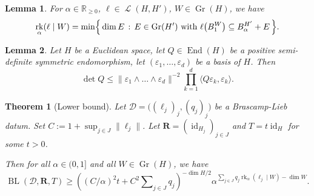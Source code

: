 \documentclass[10pt,a4paper]{amsart}
\newtheorem{thm}{Theorem}
\newtheorem{lemma}{Lemma}
\DeclareMathOperator{\BL}{BL}
\DeclareMathOperator{\Ell}{\mathscr{L}}
\DeclareMathOperator{\End}{End}
\DeclareMathOperator{\Gr}{Gr}
\newcommand{\R}{\mathbb{R}}
\DeclareMathOperator{\Span}{Span}
\newcommand{\bR}{\mathbf{R}}
\newcommand{\eps}{\varepsilon}
\DeclareMathOperator{\id}{id}
\DeclareMathOperator{\rk}{rk}
\newcommand{\sD} {{\mathscr D}}
\newcommand{\setBig}[1]{\Bigl\{\, #1 \,\Bigr\}}
\begin{document}
\begin{lemma}
\label{lm:arank}
For $\alpha \in \R_{\geq 0}$, $\ell \in \Ell(H,H')$,  $W \in \Gr(H)$, we have
\[
\rk_{\alpha}(\ell \mid W) = \min \setBig{\dim E \,:\, E \in \Gr(H') \text{ with } \ell \bigl(B^W_1\bigr) \subseteq B^{H'}_\alpha + E}.
\]
\end{lemma}

\begin{lemma}\label{eq:Choleski}
Let $H$ be a Euclidean space, let $Q\in \End(H)$ be a positive semi-definite symmetric endomorphism,  let  $(\eps_{1}, \dots, \eps_{d})$ be a basis of $H$.
Then
\begin{equation*}
\det Q \leq \|\eps_{1}\wedge \dots \wedge \eps_{d}\|^{-2}\prod_{k=1}^d \langle Q \eps_{k}, \eps_{k}\rangle.
\end{equation*}
\end{lemma}

\begin{thm}[Lower bound]\label{thm:loc-lb}
Let $\sD = \bigl( (\ell_j)_j, (q_j)_j \bigr)$ be a Brascamp-Lieb datum. Set $C:=1+\sup_{j\in J} \|\ell_{j}\|$.
Let $\bR = (\id_{H_j})_{j \in J}$ and $T = t \id_H$ for some $t>0$.

Then for all $\alpha \in (0, 1]$ and all $W \in \Gr(H)$, we have
\[
\BL( \sD, \bR, T) \geq \left( (C/\alpha)^2 t+ C^2\sum\nolimits_{j \in J} q_j \right)^{-\dim H / 2} \alpha^{\sum_{j \in J} q_j \rk_{\alpha}(\ell_j \mid W) - \dim W}.
\]
\end{thm}
\end{document}
